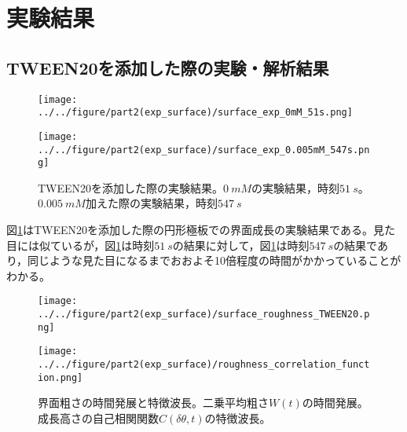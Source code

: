 \documentclass[autodetect-engine,dvi=dvipdfmx,a4paper,ja=standard,oneside,openany,11pt]{bxjsbook}
\begin{document}
\section{実験結果}
\subsection{TWEEN20を添加した際の実験・解析結果}
\begin{figure}[htbp]
  \begin{minipage}
    {0.5\textwidth}
    \subcaption{}
    \centering
    \texttt{[image: ../../figure/part2(exp\_surface)/surface\_exp\_0mM\_51s.png]}
    \label{fig:surface_exp_0mM_51s}
  \end{minipage}
  \begin{minipage}
    {0.5\textwidth}
    \subcaption{}
    \centering
    \texttt{[image: ../../figure/part2(exp\_surface)/surface\_exp\_0.005mM\_547s.png]}
    \label{fig:surface_exp_0.005mM_547s}
  \end{minipage}
  \caption{TWEEN20を添加した際の実験結果。$\SI{0}{mM}$の実験結果，時刻$\SI{51}{s}$。$\SI{0.005}{mM}$加えた際の実験結果，時刻$\SI{547}{s}$}
  \label{fig:surface_exp}
\end{figure}
図\ref{fig:surface_exp}はTWEEN20を添加した際の円形極板での界面成長の実験結果である。見た目には似ているが，図\ref{fig:surface_exp}は時刻$\SI{51}{s}$の結果に対して，図\ref{fig:surface_exp}は時刻$\SI{547}{s}$の結果であり，同じような見た目になるまでおおよそ10倍程度の時間がかかっていることがわかる。

\begin{figure}[htbp]
  \begin{minipage}{0.43\textwidth}
    \subcaption{}
    \centering
    \texttt{[image: ../../figure/part2(exp\_surface)/surface\_roughness\_TWEEN20.png]}
    \label{fig:surface_roughness_TWEEN20}
  \end{minipage}
  \begin{minipage}{0.55\textwidth}
    \subcaption{}
    \centering
    \texttt{[image: ../../figure/part2(exp\_surface)/roughness\_correlation\_function.png]}
    \label{fig:roughness_correlation_function}
  \end{minipage}
  \caption{界面粗さの時間発展と特徴波長。二乗平均粗さ$W(t)$の時間発展。成長高さの自己相関関数$C(\delta\theta,t)$の特徴波長。}
  \label{fig:surface_roughness}
\end{figure}
\end{document}
